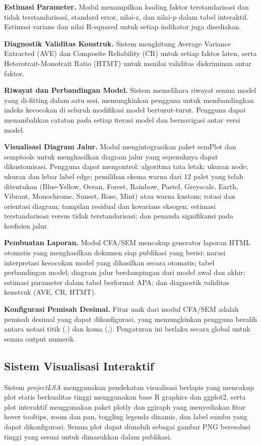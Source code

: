 \documentclass[12pt,a4paper]{article}
\begin{document}
\textbf{Estimasi Parameter.} Modul menampilkan loading faktor terstandarisasi dan tidak terstandarisasi, standard error, nilai-z, dan nilai-p dalam tabel interaktif. Estimasi varians dan nilai R-squared untuk setiap indikator juga disediakan.

\textbf{Diagnostik Validitas Konstruk.} Sistem menghitung Average Variance Extracted (AVE) dan Composite Reliability (CR) untuk setiap faktor laten, serta Heterotrait-Monotrait Ratio (HTMT) untuk menilai validitas diskriminan antar faktor.

\textbf{Riwayat dan Perbandingan Model.} Sistem memelihara riwayat semua model yang di-fitting dalam satu sesi, memungkinkan pengguna untuk membandingkan indeks kecocokan di seluruh modifikasi model berturut-turut. Pengguna dapat menambahkan catatan pada setiap iterasi model dan bernavigasi antar versi model.

\textbf{Visualisasi Diagram Jalur.} Modul mengintegrasikan paket semPlot dan semptools untuk menghasilkan diagram jalur yang sepenuhnya dapat dikustomisasi. Pengguna dapat mengontrol: algoritma tata letak; ukuran node; ukuran dan lebar label edge; pemilihan skema warna dari 12 palet yang telah ditentukan (Blue-Yellow, Ocean, Forest, Rainbow, Pastel, Greyscale, Earth, Vibrant, Monochrome, Sunset, Rose, Mint) atau warna kustom; rotasi dan orientasi diagram; tampilan residual dan kovarians eksogen; estimasi terstandarisasi versus tidak terstandarisasi; dan penanda signifikansi pada koefisien jalur.

\textbf{Pembuatan Laporan.} Modul CFA/SEM mencakup generator laporan HTML otomatis yang menghasilkan dokumen siap publikasi yang berisi: narasi interpretasi kecocokan model yang dihasilkan secara otomatis; tabel perbandingan model; diagram jalur berdampingan dari model awal dan akhir; estimasi parameter dalam tabel berformat APA; dan diagnostik validitas konstruk (AVE, CR, HTMT).

\textbf{Konfigurasi Pemisah Desimal.} Fitur unik dari modul CFA/SEM adalah pemisah desimal yang dapat dikonfigurasi, yang memungkinkan pengguna beralih antara notasi titik (.) dan koma (,). Pengaturan ini berlaku secara global untuk semua output numerik.

\subsection{Sistem Visualisasi Interaktif}

Sistem \textit{projectLSA} menggunakan pendekatan visualisasi berlapis yang mencakup plot statis berkualitas tinggi menggunakan base R graphics dan ggplot2, serta plot interaktif menggunakan paket plotly dan ggiraph yang menyediakan fitur hover tooltips, zoom dan pan, toggling legenda dinamis, dan label sumbu yang dapat dikonfigurasi. Semua plot dapat diunduh sebagai gambar PNG beresolusi tinggi yang sesuai untuk dimasukkan dalam publikasi.
\end{document}
